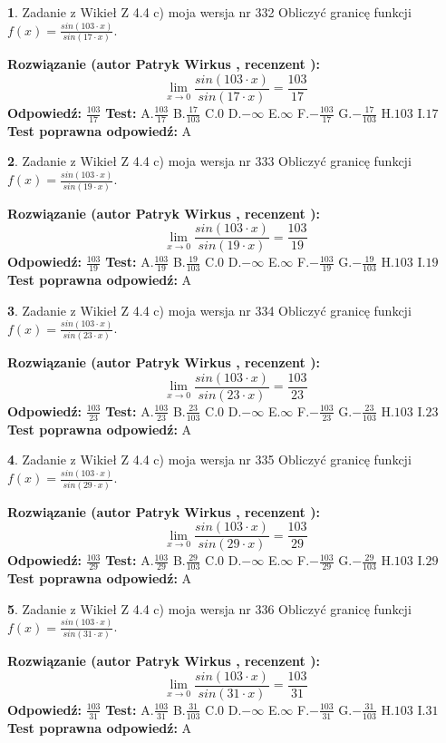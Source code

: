 \documentclass[12pt, a4paper]{article}
\theoremstyle{definition} %
\newtheorem{zad}{}
\newcommand{\zadStart}[1]{\begin{zad}#1\newline}
\newcommand{\zadStop}{\end{zad}}
\newcommand{\rozwStart}[2]{\noindent \textbf{Rozwiązanie (autor #1 , recenzent #2): }\newline}
\newcommand{\rozwStop}{\newline}
\newcommand{\odpStart}{\noindent \textbf{Odpowiedź:}\newline}
\newcommand{\odpStop}{\newline}
\newcommand{\testStart}{\noindent \textbf{Test:}\newline}
\newcommand{\testStop}{\newline}
\newcommand{\kluczStart}{\noindent \textbf{Test poprawna odpowiedź:}\newline}
\newcommand{\kluczStop}{\newline}
\begin{document}
\zadStart{Zadanie z Wikieł Z 4.4 c) moja wersja nr 332}
Obliczyć granicę funkcji $f(x)=\frac{sin(103\cdot x)}{sin(17\cdot x)}$.
\zadStop
\rozwStart{Patryk Wirkus}{}
$$\lim\limits_{x\to 0}\frac{sin(103\cdot x)}{sin(17\cdot x)}=
\frac{103}{17}$$
\rozwStop
\odpStart
$\frac{103}{17}$
\odpStop
\testStart
A.$\frac{103}{17}$
B.$\frac{17}{103}$
C.$0$
D.$-\infty$
E.$\infty$
F.$-\frac{103}{17}$
G.$-\frac{17}{103}$
H.$103$
I.$17$
\testStop
\kluczStart
A
\kluczStop



\zadStart{Zadanie z Wikieł Z 4.4 c) moja wersja nr 333}
Obliczyć granicę funkcji $f(x)=\frac{sin(103\cdot x)}{sin(19\cdot x)}$.
\zadStop
\rozwStart{Patryk Wirkus}{}
$$\lim\limits_{x\to 0}\frac{sin(103\cdot x)}{sin(19\cdot x)}=
\frac{103}{19}$$
\rozwStop
\odpStart
$\frac{103}{19}$
\odpStop
\testStart
A.$\frac{103}{19}$
B.$\frac{19}{103}$
C.$0$
D.$-\infty$
E.$\infty$
F.$-\frac{103}{19}$
G.$-\frac{19}{103}$
H.$103$
I.$19$
\testStop
\kluczStart
A
\kluczStop



\zadStart{Zadanie z Wikieł Z 4.4 c) moja wersja nr 334}
Obliczyć granicę funkcji $f(x)=\frac{sin(103\cdot x)}{sin(23\cdot x)}$.
\zadStop
\rozwStart{Patryk Wirkus}{}
$$\lim\limits_{x\to 0}\frac{sin(103\cdot x)}{sin(23\cdot x)}=
\frac{103}{23}$$
\rozwStop
\odpStart
$\frac{103}{23}$
\odpStop
\testStart
A.$\frac{103}{23}$
B.$\frac{23}{103}$
C.$0$
D.$-\infty$
E.$\infty$
F.$-\frac{103}{23}$
G.$-\frac{23}{103}$
H.$103$
I.$23$
\testStop
\kluczStart
A
\kluczStop



\zadStart{Zadanie z Wikieł Z 4.4 c) moja wersja nr 335}
Obliczyć granicę funkcji $f(x)=\frac{sin(103\cdot x)}{sin(29\cdot x)}$.
\zadStop
\rozwStart{Patryk Wirkus}{}
$$\lim\limits_{x\to 0}\frac{sin(103\cdot x)}{sin(29\cdot x)}=
\frac{103}{29}$$
\rozwStop
\odpStart
$\frac{103}{29}$
\odpStop
\testStart
A.$\frac{103}{29}$
B.$\frac{29}{103}$
C.$0$
D.$-\infty$
E.$\infty$
F.$-\frac{103}{29}$
G.$-\frac{29}{103}$
H.$103$
I.$29$
\testStop
\kluczStart
A
\kluczStop



\zadStart{Zadanie z Wikieł Z 4.4 c) moja wersja nr 336}
Obliczyć granicę funkcji $f(x)=\frac{sin(103\cdot x)}{sin(31\cdot x)}$.
\zadStop
\rozwStart{Patryk Wirkus}{}
$$\lim\limits_{x\to 0}\frac{sin(103\cdot x)}{sin(31\cdot x)}=
\frac{103}{31}$$
\rozwStop
\odpStart
$\frac{103}{31}$
\odpStop
\testStart
A.$\frac{103}{31}$
B.$\frac{31}{103}$
C.$0$
D.$-\infty$
E.$\infty$
F.$-\frac{103}{31}$
G.$-\frac{31}{103}$
H.$103$
I.$31$
\testStop
\kluczStart
A
\kluczStop
\end{document}

